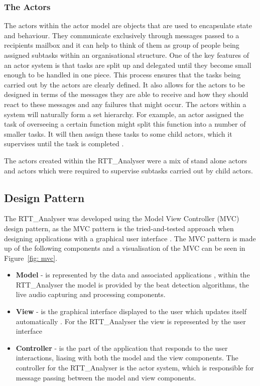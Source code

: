 \documentclass[a4paper, 11pt]{article}
\begin{document}
\subsubsection{The Actors}
The actors within the actor model are objects that are used to encapsulate state and behaviour. They communicate exclusively through messages passed to a recipients mailbox and it can help to think of them as group of people being assigned subtasks within an organisational structure. One of the key features of an actor system is that tasks are split up and delegated until they become small enough to be handled in one piece. This process ensures that the tasks being carried out by the actors are clearly defined. It also allows for the actors to be designed in terms of the messages they are able to receive and how they should react to these messages and any failures that might occur. The actors within a system will naturally form a set hierarchy. For example, an actor assigned the task of overseeing a certain function might split this function into a number of smaller tasks. It will then assign these tasks to some child actors, which it supervises until the task is completed \cite{acotrsys}.\par 

The actors created within the RTT\_Analyser were a mix of stand alone actors and actors which were required to supervise subtasks carried out by child actors.

\subsection{Design Pattern}
The RTT\_Analyser was developed using the Model View Controller (MVC) design pattern, as the MVC pattern is the tried-and-tested approach when designing applications with a graphical user interface \cite{designPatterns}. The MVC pattern is made up of the following components and a visualisation of the MVC can be seen in Figure~\ref{fig: mvc}. 

\begin{itemize}
\item \textbf{Model} - is represented by the data and associated applications \cite{designPatterns}, within the RTT\_Analyser the model is provided by the beat detection algorithms, the live audio capturing and processing components.\\
\item \textbf{View} - is the graphical interface displayed to the user which updates itself automatically \cite{designPatterns}. For the RTT\_Analyser the view is represented by the user interface\\
\item \textbf{Controller} - is the part of the application that responds to the user interactions, liasing with both the model and the view components\cite{designPatterns}. The controller for the RTT\_Analyser is the actor system, which is responsible for message passing between the model and view components.
\end{itemize}
\end{document}
